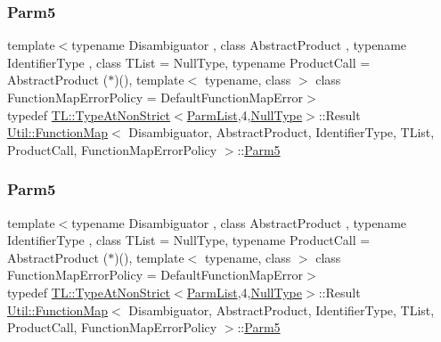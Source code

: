 \subsubsection{\texorpdfstring{Parm5}{Parm5}\hspace{0.1cm}{\footnotesize\ttfamily [1/2]}}
{\footnotesize\ttfamily template$<$typename Disambiguator , class Abstract\+Product , typename Identifier\+Type , class T\+List  = Null\+Type, typename Product\+Call  = Abstract\+Product ($\ast$)(), template$<$ typename, class $>$ class Function\+Map\+Error\+Policy = Default\+Function\+Map\+Error$>$ \\
typedef \mbox{\hyperlink{structUtil_1_1TL_1_1TypeAtNonStrict}{T\+L\+::\+Type\+At\+Non\+Strict}}$<$\mbox{\hyperlink{classUtil_1_1FunctionMap_a6cf0e6766cf6f20642ba61c4994bb477}{Parm\+List}},4,\mbox{\hyperlink{classUtil_1_1NullType}{Null\+Type}}$>$\+::Result \mbox{\hyperlink{classUtil_1_1FunctionMap}{Util\+::\+Function\+Map}}$<$ Disambiguator, Abstract\+Product, Identifier\+Type, T\+List, Product\+Call, Function\+Map\+Error\+Policy $>$\+::\mbox{\hyperlink{classUtil_1_1FunctionMap_a993589d5b721f73c7905377e24dbf9f4}{Parm5}}}

\mbox{\label{classUtil_1_1FunctionMap_a993589d5b721f73c7905377e24dbf9f4}} 
\subsubsection{\texorpdfstring{Parm5}{Parm5}\hspace{0.1cm}{\footnotesize\ttfamily [2/2]}}
{\footnotesize\ttfamily template$<$typename Disambiguator , class Abstract\+Product , typename Identifier\+Type , class T\+List  = Null\+Type, typename Product\+Call  = Abstract\+Product ($\ast$)(), template$<$ typename, class $>$ class Function\+Map\+Error\+Policy = Default\+Function\+Map\+Error$>$ \\
typedef \mbox{\hyperlink{structUtil_1_1TL_1_1TypeAtNonStrict}{T\+L\+::\+Type\+At\+Non\+Strict}}$<$\mbox{\hyperlink{classUtil_1_1FunctionMap_a6cf0e6766cf6f20642ba61c4994bb477}{Parm\+List}},4,\mbox{\hyperlink{classUtil_1_1NullType}{Null\+Type}}$>$\+::Result \mbox{\hyperlink{classUtil_1_1FunctionMap}{Util\+::\+Function\+Map}}$<$ Disambiguator, Abstract\+Product, Identifier\+Type, T\+List, Product\+Call, Function\+Map\+Error\+Policy $>$\+::\mbox{\hyperlink{classUtil_1_1FunctionMap_a993589d5b721f73c7905377e24dbf9f4}{Parm5}}}

